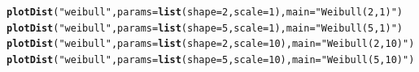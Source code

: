 \documentclass[twoside]{book}\usepackage[]{graphicx}\usepackage[]{xcolor}
\makeatletter
\newcommand{\hlnum}[1]{\textcolor[rgb]{0.686,0.059,0.569}{#1}}%
\newcommand{\hlstr}[1]{\textcolor[rgb]{0.192,0.494,0.8}{#1}}%
\newcommand{\hlstd}[1]{\textcolor[rgb]{0.345,0.345,0.345}{#1}}%
\newcommand{\hlkwc}[1]{\textcolor[rgb]{0.333,0.667,0.333}{#1}}%
\newcommand{\hlkwd}[1]{\textcolor[rgb]{0.737,0.353,0.396}{\textbf{#1}}}%
\newenvironment{kframe}{%
 \def\at@end@of@kframe{}%
 \ifinner\ifhmode%
  \def\at@end@of@kframe{\end{minipage}}%
  \begin{minipage}{\columnwidth}%
 \fi\fi%
 \def\FrameCommand##1{\hskip\@totalleftmargin \hskip-\fboxsep
 \colorbox{shadecolor}{##1}\hskip-\fboxsep
     \hskip-\linewidth \hskip-\@totalleftmargin \hskip\columnwidth}%
 \MakeFramed {\advance\hsize-\width
   \@totalleftmargin\z@ \linewidth\hsize
   \@setminipage}}%
 {\par\unskip\endMakeFramed%
 \at@end@of@kframe}
\newenvironment{knitrout}{}{} %
\makeatother
\begin{document}
\begin{knitrout}
{}



\end{knitrout}

\begin{knitrout}
\color{fgcolor}\begin{kframe}
\begin{alltt}
\hlkwd{plotDist}\hlstd{(}\hlstr{"weibull"}\hlstd{,} \hlkwc{params}\hlstd{=}\hlkwd{list}\hlstd{(}\hlkwc{shape}\hlstd{=}\hlnum{2}\hlstd{,} \hlkwc{scale}\hlstd{=}\hlnum{1}\hlstd{),}\hlkwc{main}\hlstd{=}\hlstr{"Weibull(2,1)"}\hlstd{)}
\hlkwd{plotDist}\hlstd{(}\hlstr{"weibull"}\hlstd{,} \hlkwc{params}\hlstd{=}\hlkwd{list}\hlstd{(}\hlkwc{shape}\hlstd{=}\hlnum{5}\hlstd{,} \hlkwc{scale}\hlstd{=}\hlnum{1}\hlstd{),}\hlkwc{main}\hlstd{=}\hlstr{"Weibull(5,1)"}\hlstd{)}
\hlkwd{plotDist}\hlstd{(}\hlstr{"weibull"}\hlstd{,} \hlkwc{params}\hlstd{=}\hlkwd{list}\hlstd{(}\hlkwc{shape}\hlstd{=}\hlnum{2}\hlstd{,} \hlkwc{scale}\hlstd{=}\hlnum{10}\hlstd{),}\hlkwc{main}\hlstd{=}\hlstr{"Weibull(2,10)"}\hlstd{)}
\hlkwd{plotDist}\hlstd{(}\hlstr{"weibull"}\hlstd{,} \hlkwc{params}\hlstd{=}\hlkwd{list}\hlstd{(}\hlkwc{shape}\hlstd{=}\hlnum{5}\hlstd{,} \hlkwc{scale}\hlstd{=}\hlnum{10}\hlstd{),}\hlkwc{main}\hlstd{=}\hlstr{"Weibull(5,10)"}\hlstd{)}
\end{alltt}
\end{kframe}


\end{knitrout}
\end{document}
